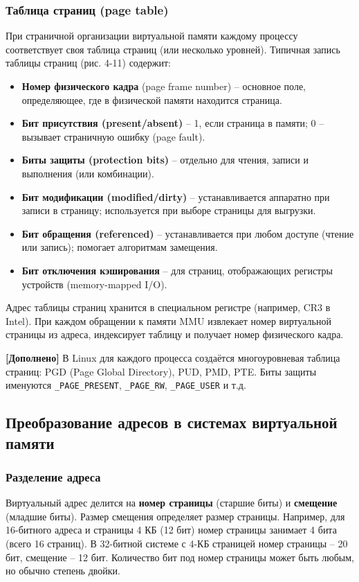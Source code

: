 \documentclass[a4paper,12pt]{article}
\begin{document}
\subsubsection{Таблица страниц (page table)}
При страничной организации виртуальной памяти каждому процессу соответствует своя таблица страниц (или несколько уровней). Типичная запись таблицы страниц (рис. 4-11) содержит:
\begin{itemize}
    \item \textbf{Номер физического кадра} (page frame number) – основное поле, определяющее, где в физической памяти находится страница.
    \item \textbf{Бит присутствия (present/absent)} – 1, если страница в памяти; 0 – вызывает страничную ошибку (page fault).
    \item \textbf{Биты защиты (protection bits)} – отдельно для чтения, записи и выполнения (или комбинации).
    \item \textbf{Бит модификации (modified/dirty)} – устанавливается аппаратно при записи в страницу; используется при выборе страницы для выгрузки.
    \item \textbf{Бит обращения (referenced)} – устанавливается при любом доступе (чтение или запись); помогает алгоритмам замещения.
    \item \textbf{Бит отключения кэширования} – для страниц, отображающих регистры устройств (memory-mapped I/O).
\end{itemize}
Адрес таблицы страниц хранится в специальном регистре (например, CR3 в Intel). При каждом обращении к памяти MMU извлекает номер виртуальной страницы из адреса, индексирует таблицу и получает номер физического кадра.

\textbf{[Дополнено]} В Linux для каждого процесса создаётся многоуровневая таблица страниц: PGD (Page Global Directory), PUD, PMD, PTE. Биты защиты именуются \texttt{\_PAGE\_PRESENT}, \texttt{\_PAGE\_RW}, \texttt{\_PAGE\_USER} и т.д.

\subsection{Преобразование адресов в системах виртуальной памяти}
\subsubsection{Разделение адреса}
Виртуальный адрес делится на \textbf{номер страницы} (старшие биты) и \textbf{смещение} (младшие биты). Размер смещения определяет размер страницы. Например, для 16-битного адреса и страницы 4 КБ (12 бит) номер страницы занимает 4 бита (всего 16 страниц). В 32-битной системе с 4-КБ страницей номер страницы – 20 бит, смещение – 12 бит. Количество бит под номер страницы может быть любым, но обычно степень двойки.
\end{document}
